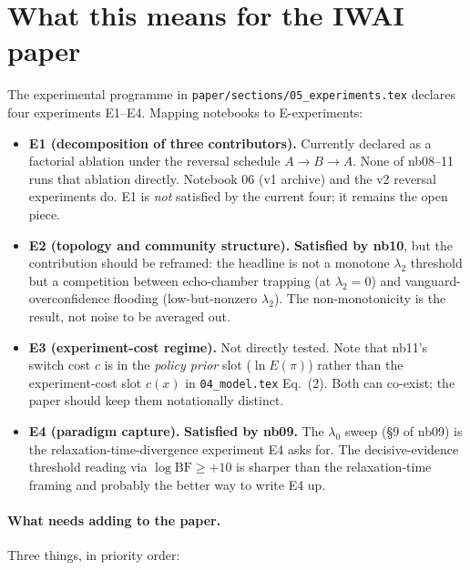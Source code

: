 \documentclass[11pt,a4paper]{article}
\theoremstyle{plain}
\begin{document}
\section{What this means for the IWAI paper}
\label{sec:paper}

The experimental programme in
\texttt{paper/sections/05\_experiments.tex} declares four experiments
E1--E4. Mapping notebooks to E-experiments:

\begin{itemize}\itemsep2pt
\item \textbf{E1 (decomposition of three contributors).} Currently
declared as a factorial ablation under the reversal schedule
$A\to B\to A$. None of nb08--11 runs that ablation directly.
Notebook 06 (v1 archive) and the v2 reversal experiments do. E1 is
\emph{not} satisfied by the current four; it remains the open piece.
\item \textbf{E2 (topology and community structure).} \textbf{Satisfied
by nb10}, but the contribution should be reframed: the headline is not
a monotone $\lambda_2$ threshold but a competition between
echo-chamber trapping (at $\lambda_2{=}0$) and vanguard-overconfidence
flooding (low-but-nonzero $\lambda_2$). The non-monotonicity is the
result, not noise to be averaged out.
\item \textbf{E3 (experiment-cost regime).} Not directly tested. Note
that nb11's switch cost $c$ is in the \emph{policy prior} slot
($\ln E(\pi)$) rather than the experiment-cost slot $c(x)$ in
\texttt{04\_model.tex} Eq.~(2). Both can co-exist; the paper should
keep them notationally distinct.
\item \textbf{E4 (paradigm capture).} \textbf{Satisfied by nb09.} The
$\lambda_0$ sweep (§9 of nb09) is the relaxation-time-divergence
experiment E4 asks for. The decisive-evidence threshold reading via
$\log\mathrm{BF}\geq+10$ is sharper than the relaxation-time framing
and probably the better way to write E4 up.
\end{itemize}

\paragraph{What needs adding to the paper.} Three things, in priority
order:
\end{document}
